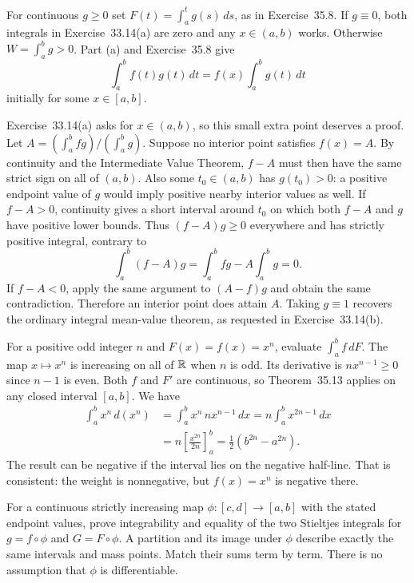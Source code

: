 For continuous $g\ge0$ set $F(t)=\int_a^tg(s)\,ds$, as in
Exercise~35.8. If $g\equiv0$, both integrals in Exercise~33.14(a)
are zero and any $x\in(a,b)$ works. Otherwise $W=\int_a^bg>0$.
Part (a) and Exercise~35.8 give
\[
 \int_a^bf(t)g(t)\,dt=f(x)\int_a^bg(t)\,dt
\]
initially for some $x\in[a,b]$.

Exercise~33.14(a) asks for $x\in(a,b)$, so this small extra point
deserves a proof. Let
$A=(\int_a^bfg)/(\int_a^bg)$. Suppose no interior point satisfies
$f(x)=A$. By continuity and the Intermediate Value Theorem,
$f-A$ must then have the same strict sign on all of $(a,b)$.
Also some $t_0\in(a,b)$ has $g(t_0)>0$: a positive endpoint
value of $g$ would imply positive nearby interior values as well.
If $f-A>0$, continuity gives a short interval around $t_0$ on which
both $f-A$ and $g$ have positive lower bounds. Thus
$(f-A)g\ge0$ everywhere and has strictly positive integral, contrary to
\[
 \int_a^b(f-A)g=\int_a^bfg-A\int_a^bg=0.
\]
If $f-A<0$, apply the same argument to $(A-f)g$ and obtain the
same contradiction. Therefore an interior point does attain $A$.
Taking $g\equiv1$ recovers the ordinary integral mean-value
theorem, as requested in Exercise~33.14(b).

\goal For a positive odd integer $n$ and $F(x)=f(x)=x^n$, evaluate
$\int_a^bf\,dF$.
The map $x\mapsto x^n$ is increasing on all of $\mathbb{R}$ when $n$ is
odd. Its derivative is $nx^{n-1}\ge0$ since $n-1$ is even.
Both $f$ and $F'$ are continuous, so Theorem~35.13 applies on
any closed interval $[a,b]$.
We have
\begin{align*}
 \int_a^bx^n\,d(x^n)
 &=\int_a^bx^n\,nx^{n-1}\,dx
   =n\int_a^bx^{2n-1}\,dx\\
 &=n\left[\frac{x^{2n}}{2n}\right]_a^b
   =\frac12(b^{2n}-a^{2n}).
\end{align*}
The result can be negative if the interval lies on the negative
half-line. That is consistent: the weight is nonnegative, but
$f(x)=x^n$ is negative there.

\goal For a continuous strictly increasing map
$\phi:[c,d]\to[a,b]$ with the stated endpoint values, prove
integrability and equality of the two Stieltjes integrals for
$g=f\circ\phi$ and $G=F\circ\phi$.
\idea A partition and its image under $\phi$ describe exactly the
same intervals and mass points. Match their sums term by term.
There is no assumption that $\phi$ is differentiable.

